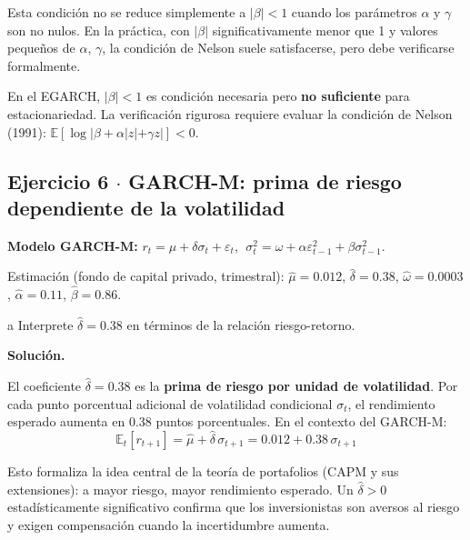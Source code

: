 \documentclass[11pt,a4paper]{article}
\newcommand{\E}{\mathbb{E}}
\newcommand{\sigmat}{\sigma^2_t}
\newcommand{\eps}{\varepsilon}
\begin{document}
Esta condición no se reduce simplemente a $|\beta|<1$ cuando los parámetros $\alpha$ y $\gamma$ son no nulos. En la práctica, con $|\beta|$ significativamente menor que 1 y valores pequeños de $\alpha$, $\gamma$, la condición de Nelson suele satisfacerse, pero debe verificarse formalmente.

\begin{cajaHallazgo}
En el EGARCH, $|\beta|<1$ es condición necesaria pero \textbf{no suficiente} para estacionariedad. La verificación rigurosa requiere evaluar la condición de Nelson (1991): $\E[\log|\beta+\alpha|z|+\gamma z|]<0$.
\end{cajaHallazgo}

\subsection*{Ejercicio 6 \texorpdfstring{$\cdot$}{·} GARCH-M: prima de riesgo dependiente de la volatilidad}

\textbf{Modelo GARCH-M:} $r_t = \mu + \delta\sigma_t + \eps_t$, $\;\sigmat = \omega + \alpha\eps_{t-1}^2 + \beta\sigma_{t-1}^2$.

Estimación (fondo de capital privado, trimestral): $\hat{\mu}=0.012$, $\hat{\delta}=0.38$, $\hat{\omega}=0.0003$, $\hat{\alpha}=0.11$, $\hat{\beta}=0.86$.

\begin{cajaInciso}{a}
Interprete $\hat{\delta}=0.38$ en términos de la relación riesgo-retorno.
\end{cajaInciso}

\textbf{Solución.}

El coeficiente $\hat{\delta}=0.38$ es la \textbf{prima de riesgo por unidad de volatilidad}. Por cada punto porcentual adicional de volatilidad condicional $\sigma_t$, el rendimiento esperado aumenta en $0.38$ puntos porcentuales. En el contexto del GARCH-M:
\[
\E_t[r_{t+1}] = \hat{\mu} + \hat{\delta}\,\sigma_{t+1} = 0.012 + 0.38\,\sigma_{t+1}
\]

Esto formaliza la idea central de la teoría de portafolios (CAPM y sus extensiones): a mayor riesgo, mayor rendimiento esperado. Un $\hat{\delta}>0$ estadísticamente significativo confirma que los inversionistas son aversos al riesgo y exigen compensación cuando la incertidumbre aumenta.
\end{document}
